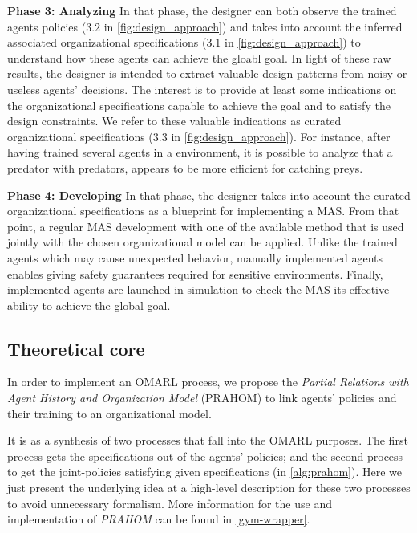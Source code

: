 \documentclass[runningheads]{llncs}
\begin{document}
\textbf{Phase 3: Analyzing} \quad In that phase, the designer can both observe the trained agents policies ($3.2$ in \autoref{fig:design_approach}) and takes into account the inferred associated organizational specifications ($3.1$ in \autoref{fig:design_approach}) to understand how these agents can achieve the gloabl goal. In light of these raw results, the designer is intended to extract valuable design patterns from noisy or useless agents' decisions. The interest is to provide at least some indications on the organizational specifications capable to achieve the goal and to satisfy the design constraints. We refer to these valuable indications as curated organizational specifications ($3.3$ in \autoref{fig:design_approach}). For instance, after having trained several agents in a  environment, it is possible to analyze that a  predator with  predators, appears to be more efficient for catching preys.

\textbf{Phase 4: Developing} \quad In that phase, the designer takes into account the curated organizational specifications as a blueprint for implementing a MAS. From that point, a regular MAS development with one of the available method that is used jointly with the chosen organizational model can be applied. Unlike the trained agents which may cause unexpected behavior, manually implemented agents enables giving safety guarantees required for sensitive environments. Finally, implemented agents are launched in simulation to check the MAS its effective ability to achieve the global goal.

\subsection{Theoretical core}

In order to implement an OMARL process, we propose the \emph{Partial Relations with Agent History and Organization Model} (PRAHOM) to link agents' policies and their training to an organizational model.

It is as a synthesis of two processes that fall into the OMARL purposes. The first process gets the specifications out of the agents' policies; and the second process to get the joint-policies satisfying given specifications (in \autoref{alg:prahom}).
Here we just present the underlying idea at a high-level description for these two processes to avoid unnecessary formalism. More information for the use and implementation of \emph{PRAHOM} can be found in \autoref{gym-wrapper}.
\end{document}
